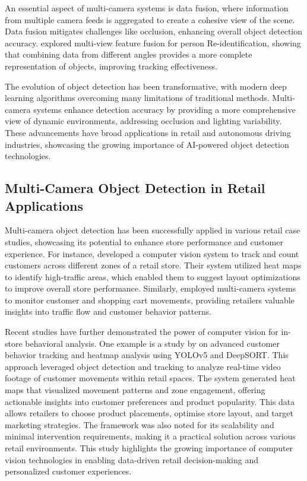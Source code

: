 {An essential aspect of multi-camera systems is data fusion, where information from multiple camera feeds is aggregated to create a cohesive view of the scene. Data fusion mitigates challenges like occlusion, enhancing overall object detection accuracy. \cite{Xu2021} explored multi-view feature fusion for person Re-identification, showing that combining data from different angles provides a more complete representation of objects, improving tracking effectiveness.

The evolution of object detection has been transformative, with modern deep learning algorithms overcoming many limitations of traditional methods. Multi-camera systems enhance detection accuracy by providing a more comprehensive view of dynamic environments, addressing occlusion and lighting variability. These advancements have broad applications in retail and autonomous driving industries, showcasing the growing importance of AI-powered object detection technologies.

\subsection{Multi-Camera Object Detection in Retail Applications}
Multi-camera object detection has been successfully applied in various retail case studies, showcasing its potential to enhance store performance and customer experience. For instance, \cite{Cabahug2023} developed a computer vision system to track and count customers across different zones of a retail store. Their system utilized heat maps to identify high-traffic areas, which enabled them to suggest layout optimizations to improve overall store performance. Similarly, \cite{Cobos2019} employed multi-camera systems to monitor customer and shopping cart movements, providing retailers valuable insights into traffic flow and customer behavior patterns.

Recent studies have further demonstrated the power of computer vision for in-store behavioral analysis. One example is a study by \cite{Shili2024} on advanced customer behavior tracking and heatmap analysis using YOLOv5 and DeepSORT. This approach leveraged object detection and tracking to analyze real-time video footage of customer movements within retail spaces. The system generated heat maps that visualized movement patterns and zone engagement, offering actionable insights into customer preferences and product popularity. This data allows retailers to choose product placements, optimise store layout, and target marketing strategies. The framework was also noted for its scalability and minimal intervention requirements, making it a practical solution across various retail environments. This study highlights the growing importance of computer vision technologies in enabling data-driven retail decision-making and personalized customer experiences.

}
